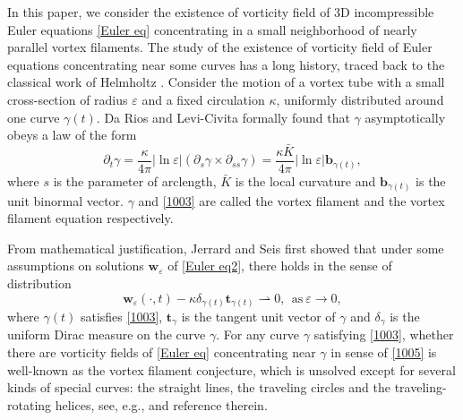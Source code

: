 \documentclass[12pt,reqno]{amsart}
\numberwithin{equation}{section}
\theoremstyle{definition}
\theoremstyle{remark}
\begin{document}
In this paper, we consider the existence of vorticity field of 3D incompressible Euler equations \eqref{Euler eq} concentrating in a small neighborhood of  nearly parallel vortex filaments. The study of the existence   of vorticity field of Euler equations concentrating near some curves  has a long history, traced back to the classical work of Helmholtz \cite{He}. %
 Consider the motion of a vortex tube with a small cross-section of radius $ \varepsilon $ and a fixed circulation $ \kappa $, uniformly distributed around one curve $ \gamma(t) $. Da Rios  and Levi-Civita  \cite{DR, LC} formally found that $ \gamma $ asymptotically obeys a law of the form 
\begin{equation}\label{1003}
\partial_t \gamma=\frac{\kappa}{4\pi}|\ln\varepsilon|(\partial_s\gamma\times\partial_{ss}\gamma)=\frac{\kappa\bar{K}}{4\pi}|\ln\varepsilon|\mathbf{b}_{\gamma(t)},
\end{equation}
where $ s $ is the parameter of arclength, $ \bar{K} $ is the local curvature and $ \mathbf{b}_{\gamma(t)}  $  is the unit binormal vector. $ \gamma $ and \eqref{1003} are  called the vortex filament and the vortex filament equation respectively.

From mathematical justification, Jerrard and Seis \cite{JS} first %
 showed that under some assumptions on   solutions $ \mathbf{w}_\varepsilon $ of \eqref{Euler eq2}, there holds in the sense of distribution 
\begin{equation}\label{1005}
\mathbf{w}_\varepsilon(\cdot,t)-\kappa \delta_{\gamma(t)}\mathbf{t}_{\gamma(t)}\rightharpoonup0,\ \ \text{as}\ \varepsilon\to0,
\end{equation}
where $ \gamma(t) $ satisfies \eqref{1003}, $ \mathbf{t}_{\gamma } $ is the tangent unit vector of $ \gamma $ and $ \delta_{\gamma } $ is the uniform Dirac measure on the curve $ \gamma $. For  any curve $ \gamma $ satisfying \eqref{1003}, whether there are vorticity fields of \eqref{Euler eq} concentrating near $ \gamma $ in sense of \eqref{1005} is   well-known as the vortex filament conjecture, which is unsolved except for   several kinds of special curves: the straight lines, the traveling circles and the traveling-rotating helices, see, e.g., \cite{CLW,CW,CW1,DDMW,DDMW2,DLM,Fr1,FB,GZ,MB} and reference therein.
\end{document}
